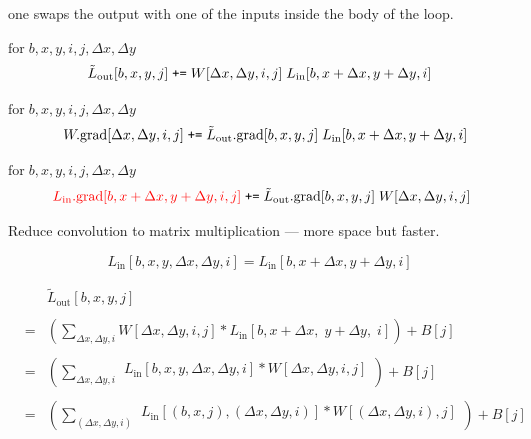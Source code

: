 {\vfill
one swaps the output with one of the inputs inside the body of the loop.


\vfill
{\color{red} $\mathrm{for}\;b,x,y,i,j,\Delta x, \Delta y$}
$$\tilde{L}_{\mathrm{out}}[b,x,y,j] \;\mbox{\tt +=}\; W[\Delta x, \Delta y, i, j]\;L_{\mathrm{in}}[b,x + \Delta x, y + \Delta y, i]$$

\vfill
{\color{red} $\mathrm{for}\;b,x,y,i,j,\Delta x, \Delta y$ }
$$\;\;\;W.\mathrm{grad}[\Delta x, \Delta y,i,j] \; \mbox{\tt +=} \; \tilde{L}_{\mathrm{out}}.\mathrm{grad}[b,x,y,j]\;L_{\mathrm{in}}[b,x + \Delta x,y+ \Delta y,i]$$

\vfill
{\color{red} $\mathrm{for}\;b,x,y,i,j,\Delta x, \Delta y$}
$$\;{\color{red} L_{\mathrm{in}}.\mathrm{grad}[b,x+\Delta x,y+\Delta y,i,j]} \;\mbox{\tt +=} \; \tilde{L}_{\mathrm{out}}.\mathrm{grad}[b,x,y,j]\;W[\Delta x, \Delta y, i, j]$$



Reduce convolution to matrix multiplication ---  more space but faster.
{\huge
  $$L_{\mathrm{in}}[b,x,y,\Delta x,\Delta y,i] = L_{\mathrm{in}}[b,x+\Delta x,y+\Delta y,i]$$

\begin{eqnarray*}
  & & \tilde{L}_{\mathrm{out}}[b,x,y,j] \\
  \\
  & = & \left(\sum_{\Delta x, \Delta y, i} W[\Delta x, \Delta y, i, j] *L_{\mathrm{in}}[b,x + \Delta x,\; y + \Delta y,\; i]\right) + B[j] \\
  \\
      & = & \left(\sum_{\Delta x, \Delta y, i} \begin{array}{l}
                                              L_{\mathrm{in}}[b,x,y,\Delta x,\Delta y,i]
                                              * W[\Delta x, \Delta y, i, j] \\
  \end{array}\right) + B[j] \\
  \\
    & = & \left(\sum_{(\Delta x, \Delta y, i)} \begin{array}{l}
                                              L_{\mathrm{in}}[(b,x,j),(\Delta x,\Delta y,i)]
                                              * W[(\Delta x, \Delta y, i), j] \\
                                           \end{array}\right) + B[j]
\end{eqnarray*}
}

}
